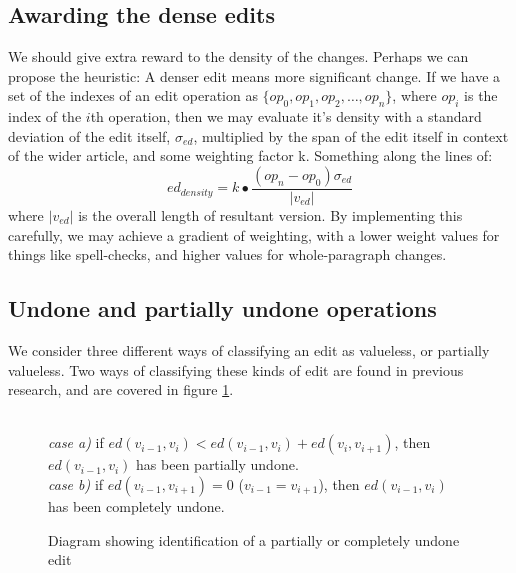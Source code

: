 \subsection*{Awarding the dense edits}
We should give extra reward to the density of the changes. Perhaps we
can propose the heuristic: A denser edit means more significant
change. If we have a set of the indexes of an edit operation as
$\{op_0,op_1,op_2,\dots, op_n\}$, where $op_i$ is the index of the
$i$th operation, then we may evaluate it's density with a standard
deviation of the edit itself, $\sigma_{ed}$, multiplied by the span of
the edit itself in context of the wider article, and some weighting
factor k. Something along the lines of:
$$ed_{density} = k\bullet\frac{(op_n - op_0)\sigma_{ed}}{|v_{ed}|}$$
where $|v_{ed}|$ is the overall length of resultant version. By
implementing this carefully, we may achieve a gradient of weighting,
with a lower weight values for things like spell-checks, and higher
values for whole-paragraph changes.

\subsection*{Undone and partially undone operations}
We consider three different ways of classifying an edit as valueless,
or partially valueless. Two ways of classifying these kinds of edit
are found in previous research, and are covered in figure
\ref{fig:undo}.

\begin{figure}[h]
  \centering
  \\
  \textit{case a)} if $ed(v_{i-1},v_i) < ed(v_{i-1},v_i) +
  ed(v_{i},v_{i+1})$, then $ed(v_{i-1},v_i)$ has been
  partially undone.\\ 
  \textit{case b)} if $ed(v_{i-1},v_{i+1}) = 0$
  ($v_{i-1} = v_{i+1}$), then $ed(v_{i-1},v_i)$ has been
  completely undone.
  \caption{Diagram showing identification of a partially or
    completely undone edit}
  \label{fig:undo}
\end{figure}

